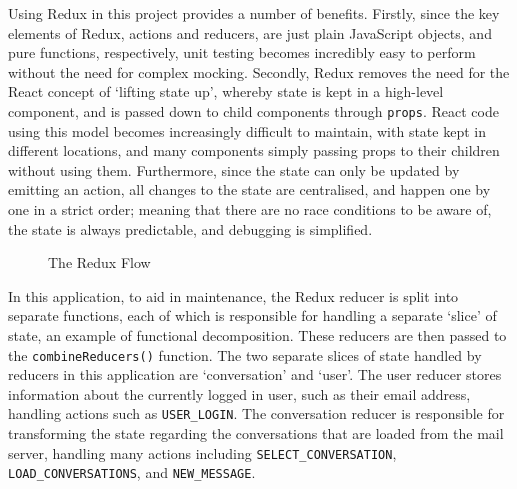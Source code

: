 Using Redux in this project provides a number of benefits. Firstly, since the key elements of Redux, actions and reducers, are just plain JavaScript objects, and pure functions, respectively, unit testing becomes incredibly easy to perform without the need for complex mocking. Secondly, Redux removes the need for the React concept of `lifting state up', whereby state is kept in a high-level component, and is passed down to child components through \verb|props|. React code using this model becomes increasingly difficult to maintain, with state kept in different locations, and many components simply passing props to their children without using them. Furthermore, since the state can only be updated by emitting an action, all changes to the state are centralised, and happen one by one in a strict order; meaning that there are no race conditions to be aware of, the state is always predictable, and debugging is simplified.

\begin{figure}[h!]
  \begin{center}
    \caption{The Redux Flow}
    \label{fig:redux-cycle}
  \end{center}
\end{figure}

In this application, to aid in maintenance, the Redux reducer is split into separate functions, each of which is responsible for handling a separate `slice' of state, an example of functional decomposition. These reducers are then passed to the \verb|combineReducers()| function. The two separate slices of state handled by reducers in this application are `conversation' and `user'. The user reducer stores information about the currently logged in user, such as their email address, handling actions such as \verb|USER_LOGIN|. The conversation reducer is responsible for transforming the state regarding the conversations that are loaded from the mail server, handling many actions including \verb|SELECT_CONVERSATION|, \verb|LOAD_CONVERSATIONS|, and \verb|NEW_MESSAGE|.


